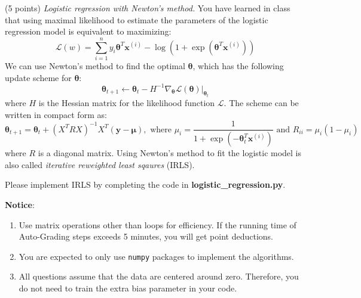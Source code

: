 \documentclass[a4paper, 12pt]{exam}
\begin{document}
\begin{questions}
		\question (5 points) \emph{Logistic regression with Newton's method. } You have learned in class that using maximal likelihood to estimate the parameters of the logistic regression model is equivalent to maximizing:
		\begin{equation*}
		\mathcal{L}(w) = \sum_{i=1}^n y_i \bm{\theta}^T \bm{x}^{(i)} - \log ( 1 + \exp(\bm{\theta}^T \bm{x}^{(i)}))
		\end{equation*}
		We can use Newton's method to find the optimal $\bm{\theta}$, which has the following update scheme for $\bm{\theta}$:
		\begin{equation*}
		\bm{\theta}_{t+1} \leftarrow \bm{\theta}_t - H^{-1} \nabla_{\bm{\theta}} \mathcal{L}(\bm{\theta})|_{\bm{\theta}_t}
		\end{equation*}
		where $H$ is the Hessian matrix for the likelihood function $\mathcal{L}$.
		The scheme can be written in compact form as:
		\begin{equation*}
		\bm{\theta}_{t+1} = \bm{\theta}_t + (X^TRX)^{-1} X^T(\bm{y}-\bm{\mu}), \textrm{ where } \mu_i = \frac{1}{1+\exp(-\bm{\theta}_t^T\bm{x}^{(i)})} \textrm{ and } R_{ii} = \mu_i ( 1 - \mu_i)
		\end{equation*}
		where $R$ is a diagonal matrix. Using Newton's method to fit the logistic model is also called {\em iterative reweighted least sqaures} (IRLS).
		
		Please implement IRLS by completing the code in \textbf{logistic\_regression.py}.
		
	\end{questions}
	
	
	\nocite{*}
	\begin{flushleft}
		\textbf{Notice}: \\
		\begin{enumerate}
			\item Use matrix operations other than loops for efficiency. If the running time of Auto-Grading steps exceeds 5 minutes, you will get point deductions.
			\item You are expected to only use \texttt{numpy} packages to implement the algorithms.
			\item All questions assume that the data are centered around zero. Therefore, you do not need to train the extra bias parameter in your code.
		\end{enumerate}
	\end{flushleft}
	
\end{document}
